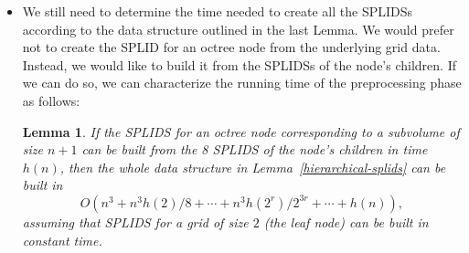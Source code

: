 \documentclass[10pt]{article}
\newtheorem{lemma}{Lemma}[section]
\begin{document}
\begin{itemize}
    \begin{proof}
        Note that a grid of size $n+1$ partitions the unit
        cube to $n^3$ cells. We build an octree on these $n^3$
        cells such that each leaf corresponds to a cell.
        For each node in the octree, we build a SPLIDS for
        the volume corresponding to the node. This yields 
        a data structure with 
        $$O(n^3g(1) + n^3g(2)/8 + \dotsb + n^3 g(2^r) / 2^{3r}
        + \dotsb + g(n))$$ space.
        
        Given two points $\mathbf{p}_0$ and $\mathbf{p}_1$
        inside the unit cube, we answer the query as follows.
        From the data structure, we can find a sequence of 
        non-intersecting volumes with the following properties:
        \begin{itemize}
            \item The volumes in the sequence are non-intersecting.
            \item The volumes together covers the line segment
                from $\mathbf{p}_0$ to $\mathbf{p}_1$.
            \item Each volume corresponds to a node in the octree.
            \item There are at most 4 volumes in the sequence
                belonging to each level of the octree.
        \end{itemize}
        The procedure of finding such a sequence of volumes
        is pretty much like tracing a ray from $\mathbf{p}_0$
        to $\mathbf{p}_1$ in an octree. We can then use the 
        SPLIDS for each volume to compute the line integral
        of the part of the segment that goes through the volume,
        and then add all the result together. This process
        thus takes $O(f(1) + f(2) + \dotsb + f(2^r) + \dotsb + f(n))$
        as desired.
    \end{proof}
    
    \item We still need to determine the time needed to create
        all the SPLIDSs according to the data structure
        outlined in the last Lemma. We would prefer not to
        create the SPLID for an octree node from the underlying
        grid data. Instead, we would like to build it from
        the SPLIDSs of the node's children. If we can
        do so, we can characterize the running time of
        the preprocessing phase as follows:
        
        \begin{lemma}
            If the SPLIDS for an octree node corresponding
            to a subvolume of size $n+1$ can be built from
            the 8 SPLIDS of the node's children in time $h(n)$,
            then the whole data structure in 
            Lemma~\ref{hierarchical-splids} can be built
            in $$O(n^3 + n^3h(2)/8 + \dotsb +  
            n^3 h(2^r) / 2^{3r} +\dotsb + h(n)),$$
            assuming that SPLIDS for a grid
            of size $2$ (the leaf node) can be built 
            in constant time.
        \end{lemma}
        

\end{itemize}
\end{document}
